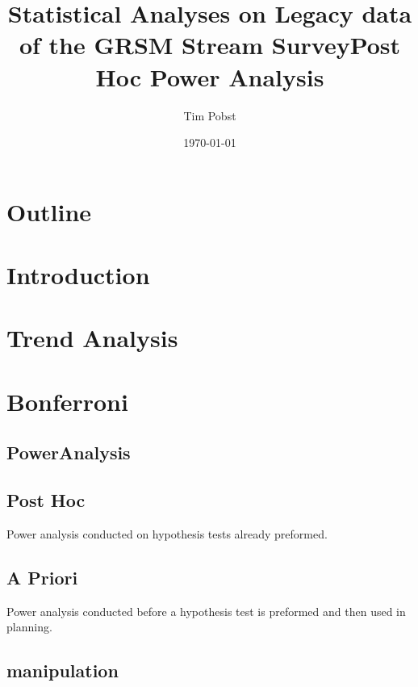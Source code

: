 \documentclass{beamer}
\title{Statistical Analyses on Legacy data of the GRSM Stream Survey}
\author{Tim Pobst}
\date{\today}
\begin{document}
\begin{frame}
	\titlepage
\end{frame}

\section*{Outline}
\begin{frame}
	\tableofcontents
\end{frame}

\section{Introduction}

\section{Trend Analysis}%

\section{Bonferroni}%

\begin{frame}

\section{PowerAnalysis}

\subsection{Post Hoc}%
\title{Post Hoc Power Analysis}
\alert{Power analysis conducted on hypothesis tests already preformed.}

\subsection{A Priori}%
Power analysis conducted before a hypothesis test is preformed and then used in planning.

\subsection{manipulation}%

\end{frame}
\end{document}
